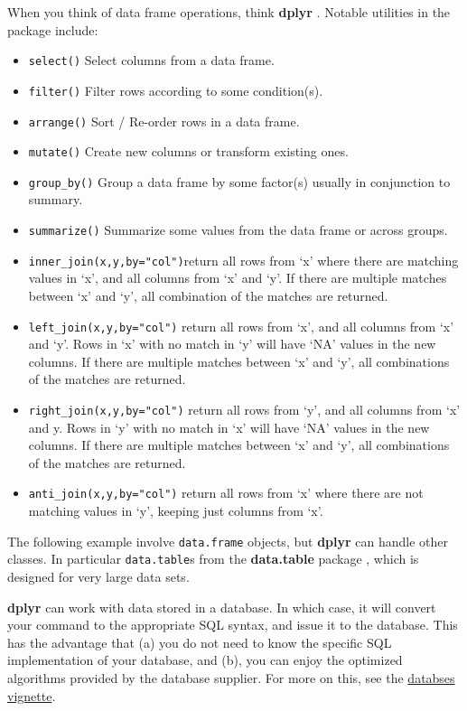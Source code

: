 \documentclass[]{book}
\providecommand{\tightlist}{%
  \setlength{\itemsep}{0pt}\setlength{\parskip}{0pt}}
\theoremstyle{definition}
\theoremstyle{definition}
\theoremstyle{definition}
\theoremstyle{remark}
\begin{document}
When you think of data frame operations, think \textbf{dplyr}
\citep{dplyr}. Notable utilities in the package include:

\begin{itemize}
\tightlist
\item
  \texttt{select()} Select columns from a data frame.
\item
  \texttt{filter()} Filter rows according to some condition(s).
\item
  \texttt{arrange()} Sort / Re-order rows in a data frame.
\item
  \texttt{mutate()} Create new columns or transform existing ones.
\item
  \texttt{group\_by()} Group a data frame by some factor(s) usually in
  conjunction to summary.
\item
  \texttt{summarize()} Summarize some values from the data frame or
  across groups.
\item
  \texttt{inner\_join(x,y,by="col")}return all rows from `x' where there
  are matching values in `x', and all columns from `x' and `y'. If there
  are multiple matches between `x' and `y', all combination of the
  matches are returned.
\item
  \texttt{left\_join(x,y,by="col")} return all rows from `x', and all
  columns from `x' and `y'. Rows in `x' with no match in `y' will have
  `NA' values in the new columns. If there are multiple matches between
  `x' and `y', all combinations of the matches are returned.
\item
  \texttt{right\_join(x,y,by="col")} return all rows from `y', and all
  columns from `x' and y. Rows in `y' with no match in `x' will have
  `NA' values in the new columns. If there are multiple matches between
  `x' and `y', all combinations of the matches are returned.
\item
  \texttt{anti\_join(x,y,by="col")} return all rows from `x' where there
  are not matching values in `y', keeping just columns from `x'.
\end{itemize}

The following example involve \texttt{data.frame} objects, but
\textbf{dplyr} can handle other classes. In particular
\texttt{data.table}s from the \textbf{data.table} package
\citep{datatable}, which is designed for very large data sets.

\textbf{dplyr} can work with data stored in a database. In which case,
it will convert your command to the appropriate SQL syntax, and issue it
to the database. This has the advantage that (a) you do not need to know
the specific SQL implementation of your database, and (b), you can enjoy
the optimized algorithms provided by the database supplier. For more on
this, see the
\href{https://cran.r-project.org/web/packages/dplyr/vignettes/databases.html}{databses
vignette}.
\end{document}
